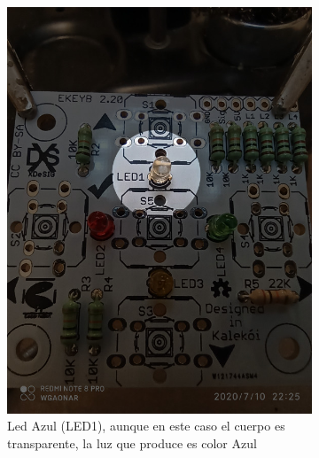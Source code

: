 \documentclass{article}
\begin{document}
\begin{figure}[H]
    \vspace{0.5cm}
    \begin{subfigure}[t]{0.3\textwidth}
        \centering
        \includegraphics[width=0.9\columnwidth, height=1.2\columnwidth]{images/Botonera/led3.jpg}
        \caption{Led Azul (LED1), aunque en este caso el cuerpo es transparente, la luz que produce es color Azul}
        \label{fig:botonera_led3}
    \end{subfigure}%
    \begin{subfigure}[t]{0.3\textwidth}
        \centering

\end{subfigure}
\end{figure}
\end{document}

